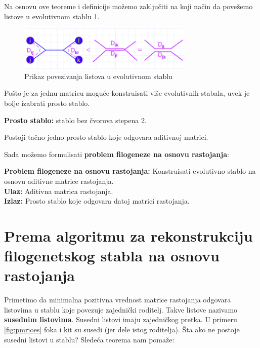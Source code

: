 Na osnovu ove teoreme i definicije mo\v{z}emo zaklju\v{c}iti na koji na\v{c}in da pove\v{z}emo listove u evolutivnom stablu \ref{fig:pples}.

\begin{figure}[h!]
\begin{center}
\includegraphics[width=0.75\textwidth]{poglavlja/7/slike/slika4.png}
\end{center}
\caption{Prikaz povezivanja listova u evolutivnom stablu}
\label{fig:pples}
\end{figure}

Po\v{s}to je za jednu matricu mogu\'ce konstruisati vi\v{s}e evolutivnih stabala, uvek je bolje izabrati prosto stablo. 

\begin{definicija}
\textbf{Prosto stablo:} stablo bez \v{c}vorova stepena 2.
\end{definicija}

\begin{teorema}
Postoji ta\v{c}no jedno prosto stablo koje odgovara aditivnoj matrici.
\end{teorema}

Sada mo\v{z}emo formulisati \textbf{problem filogeneze na osnovu rastojanja}:

\begin{tcolorbox}
\textbf{Problem filogeneze na osnovu rastojanja:}
Konstruisati evolutivno stablo na osnovu aditivne matrice rastojanja. \\
\textbf{Ulaz:} Aditivna matrica rastojanja.\\
\textbf{Izlaz:} Prosto stablo koje odgovara datoj matrici rastojanja.
\end{tcolorbox}

\section{Prema algoritmu za rekonstrukciju filogenetskog stabla na osnovu rastojanja}
\label{pazrfsnor}

Primetimo da minimalna pozitivna vrednost matrice rastojanja odgovara listovima u stablu koje povezuje zajedni\v{c}ki roditelj. Takve listove nazivamo \textbf{susednim listovima}. Susedni listovi imaju zajedničkog pretka. U primeru \ref{fig:pmrioes} foka i kit su susedi (jer dele istog roditelja). Šta ako ne postoje susedni listovi u stablu? Sledeća teorema nam pomaže:

